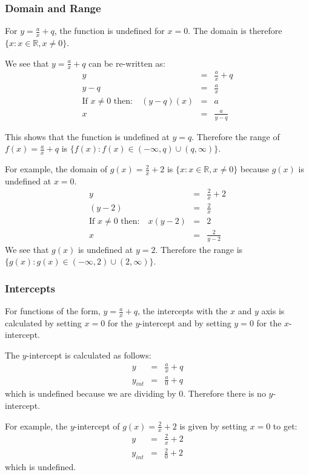 \documentclass[10pt,a4paper,titlepage,twoside,openright]{report}
\begin{document}
\subsubsection{Domain and Range}
For $y=\frac{a}{x} + q$, the function is undefined for $x=0$. The domain is therefore $\{x:x\in\mathbb{R},x\ne 0\}$.

We see that $y=\frac{a}{x} + q$ can be re-written as:
\begin{eqnarray*}
y&=&\frac{a}{x} + q\\
y-q&=&\frac{a}{x}\\
\mbox{If $x\ne 0$ then:}\quad (y-q)(x)&=&a\\
x&=&\frac{a}{y-q}
\end{eqnarray*}

This shows that the function is undefined at $y=q$. Therefore the range of $f(x)=\frac{a}{x} + q$ is $\{f(x):f(x)\in(-\infty,q) \cup (q,\infty)\}$.

For example, the domain of $g(x)=\frac{2}{x} + 2$ is $\{x:x\in\mathbb{R}, x\ne 0\}$ because $g(x)$ is undefined at $x=0$.
\begin{eqnarray*}
y&=&\frac{2}{x} + 2\\
(y-2)&=&\frac{2}{x}\\
\mbox{If $x\ne 0$ then:}\quad x(y-2)&=& 2\\
x&=&\frac{2}{y-2}
\end{eqnarray*}
We see that $g(x)$ is undefined at $y=2$. Therefore the range is $\{g(x):g(x)\in(-\infty,2)\cup(2,\infty)\}$.

\subsubsection{Intercepts}
For functions of the form, $y=\frac{a}{x} + q$, the intercepts with the $x$ and $y$ axis is calculated by setting $x=0$ for the $y$-intercept and by setting $y=0$ for the $x$-intercept.

The $y$-intercept is calculated as follows:
\begin{eqnarray}
y&=&\frac{a}{x} + q\\
y_{int}&=&\frac{a}{0} + q
\end{eqnarray}
which is undefined because we are dividing by $0$. Therefore there is no $y$-intercept.

For example, the $y$-intercept of $g(x)=\frac{2}{x} + 2$ is given by setting $x=0$ to get:
\begin{eqnarray*}
y&=&\frac{2}{x} + 2\\
y_{int}&=&\frac{2}{0} + 2
\end{eqnarray*}
which is undefined.
\end{document}
